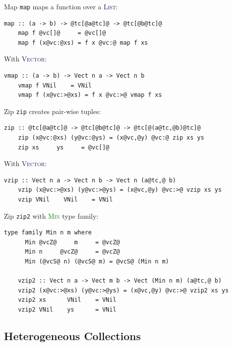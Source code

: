 \documentclass[xcolor={usenames,dvipsnames}]{beamer}
\newcommand{\htycon}[1]{\textcolor{MidnightBlue}{\textsc{#1}}}
\newcommand{\htyfam}[1]{\textcolor{Green}{\textsc{#1}}}
\begin{document}
\begin{frame}[fragile]{Map}
  \texttt{map} maps a function over a \htycon{List}:
  \begin{lstlisting}[style=hask]
    map :: (a -> b) -> @tc[@a@tc]@ -> @tc[@b@tc]@
    map f @vc[]@     = @vc[]@
    map f (x@vc:@xs) = f x @vc:@ map f xs
  \end{lstlisting}

  With \htycon{Vector}:
  \begin{lstlisting}[style=hask]
    vmap :: (a -> b) -> Vect n a -> Vect n b
    vmap f VNil    = VNil
    vmap f (x@vc:>@xs) = f x @vc:>@ vmap f xs
  \end{lstlisting}
\end{frame}

\begin{frame}[fragile]{Zip}
  \texttt{zip} creates pair-wise tuples:
  \begin{lstlisting}[style=hask]
    zip :: @tc[@a@tc]@ -> @tc[@b@tc]@ -> @tc[@(a@tc,@b)@tc]@
    zip (x@vc:@xs) (y@vc:@ys) = (x@vc,@y) @vc:@ zip xs ys
    zip xs     ys     = @vc[]@
  \end{lstlisting}

  With \htycon{Vector}:
  \begin{lstlisting}[style=hask]
    vzip :: Vect n a -> Vect n b -> Vect n (a@tc,@ b)
    vzip (x@vc:>@xs) (y@vc:>@ys) = (x@vc,@y) @vc:>@ vzip xs ys
    vzip VNil    VNil    = VNil
  \end{lstlisting}
\end{frame}

\begin{frame}[fragile]{Zip}
  \texttt{zip2} with \htyfam{Min} type family:
  \begin{lstlisting}[style=hask]
    type family Min n m where
      Min @vcZ@     m     = @vcZ@
      Min n     @vcZ@     = @vcZ@
      Min (@vcS@ n) (@vcS@ m) = @vcS@ (Min n m)

    vzip2 :: Vect n a -> Vect m b -> Vect (Min n m) (a@tc,@ b)
    vzip2 (x@vc:>@xs) (y@vc:>@ys) = (x@vc,@y) @vc:>@ vzip2 xs ys
    vzip2 xs      VNil    = VNil
    vzip2 VNil    ys      = VNil
  \end{lstlisting}
\end{frame}

\subsection{Heterogeneous Collections}
\end{document}
